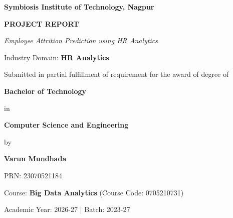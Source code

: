 \documentclass[12pt,a4paper]{report}
\newcommand{\projtitle}{Employee Attrition Prediction using HR Analytics}
\begin{document}

\begin{titlepage}

\begin{center}

\vspace{0.5cm}

\fontsize{24}{20}\textcolor{sitred}{\textbf{Symbiosis Institute of Technology, Nagpur}}\\

\vspace{0.7cm}

{\fontsize{18}{20}\selectfont \textbf{PROJECT REPORT}}

\vspace{0.4cm}

{\fontsize{15}{18}\selectfont \textit{\projtitle}}

\vspace{0.3cm}

{\fontsize{13}{16}\selectfont Industry Domain: \textbf{HR Analytics}}

\vspace{0.5cm}

Submitted in partial fulfillment of requirement for the award of degree of

\vspace{0.5cm}

{\fontsize{16}{18}\selectfont \textbf{Bachelor of Technology}}

in

{\fontsize{16}{18}\selectfont \textbf{Computer Science and Engineering}}

\vspace{0.5cm}

by

\vspace{0.5cm}

{\fontsize{14}{16}\selectfont \textbf{Varun Mundhada}}

PRN: 23070521184

\vspace{0.8cm}

{\fontsize{13}{16}\selectfont Course: \textbf{Big Data Analytics} (Course Code: 0705210731)\par}

{\fontsize{12}{15}\selectfont Academic Year: 2026-27 \quad | \quad Batch: 2023-27\par}


\end{center}
\end{titlepage}
\end{document}
